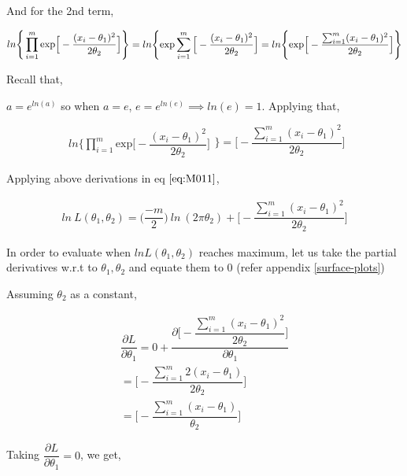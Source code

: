 \documentclass[float=false,crop=false]{standalone}
\begin{document}
    And for the 2nd term,

\[
\begin{aligned}
ln \Bigg\{  \prod_{i=1}^{m} {\text{exp}}{\Big[ -\dfrac{  (x_i-\theta_1)^2 }{2\theta_2}  \Big]}
\end{aligned} \Bigg\} 
= ln \Bigg\{ {\text{exp}}\sum\limits_{i=1}^m{\Big[ -\dfrac{  (x_i-\theta_1)^2 }{2\theta_2}  \Big]} \\
= ln \Bigg\{ {\text{exp}}{\Big[ -\dfrac{  \sum_{i=1}^m(x_i-\theta_1)^2 }{2\theta_2}  \Big]}
\Bigg\} 
\]

    Recall that,

\(a = e^{ln(a)}\) so when \(a = e\),
\(e = e^{ln(e)} \implies ln(e) = 1\). Applying that,

\[
\begin{aligned}
ln \Bigg\{  \prod_{i=1}^{m} {\text{exp}}{\Big[ -\dfrac{  (x_i-\theta_1)^2 }{2\theta_2}  \Big]}
\end{aligned} \Bigg\} 
= \Bigg[-\dfrac{  \sum_{i=1}^m(x_i-\theta_1)^2 }{2\theta_2}\Bigg]
\]

    Applying above derivations in eq \(\ref{eq:M011}\),

\begin{equation}
\begin{aligned}
ln \ L(\theta_1,\theta_2) = \bigg(\dfrac{-m}{2}\bigg) \ ln\ (2\pi\theta_2) + \Bigg[-\dfrac{  \sum_{i=1}^m(x_i-\theta_1)^2 }{2\theta_2}\Bigg] \label{eq:M012}
\end{aligned}
\end{equation}

    In order to evaluate when \(ln L(\theta_1, \theta_2)\) reaches maximum,
let us take the partial derivatives w.r.t to \(\theta_1, \theta_2\) and
equate them to 0 (refer appendix \ref{surface-plots})

Assuming \(\theta_2\) as a constant,

\begin{equation}\begin{aligned}
\dfrac{\partial L}{\partial \theta_1} = 0 +  \dfrac{\partial \Bigg[-\dfrac{  \sum_{i=1}^m(x_i-\theta_1)^2 }{2\theta_2}\Bigg]}{\partial \theta_1} \\
= \Bigg[-\dfrac{  \sum_{i=1}^m2(x_i-\theta_1) }{2\theta_2}\Bigg] \\
= \Bigg[-\dfrac{  \sum_{i=1}^m(x_i-\theta_1) }{\theta_2}\Bigg] \label{eq:M013}
\end{aligned}\end{equation}

Taking \(\dfrac{\partial L}{\partial \theta_1} = 0\), we get,
\end{document}
